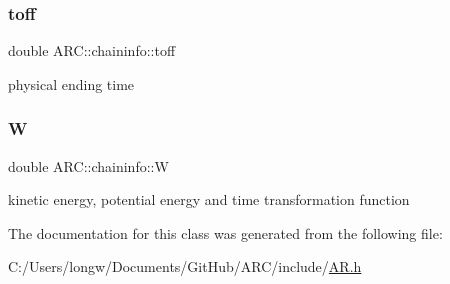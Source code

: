 \subsubsection{\texorpdfstring{toff}{toff}}
{\footnotesize\ttfamily double A\+R\+C\+::chaininfo\+::toff}



physical ending time 

\hypertarget{classARC_1_1chaininfo_a1072512674fc88001d6cd560a6c7d295}{}\label{classARC_1_1chaininfo_a1072512674fc88001d6cd560a6c7d295} 
\subsubsection{\texorpdfstring{W}{W}}
{\footnotesize\ttfamily double A\+R\+C\+::chaininfo\+::W}



kinetic energy, potential energy and time transformation function 



The documentation for this class was generated from the following file\+:\begin{DoxyCompactItemize}
\item 
C\+:/\+Users/longw/\+Documents/\+Git\+Hub/\+A\+R\+C/include/\hyperlink{AR_8h}{A\+R.\+h}\end{DoxyCompactItemize}
